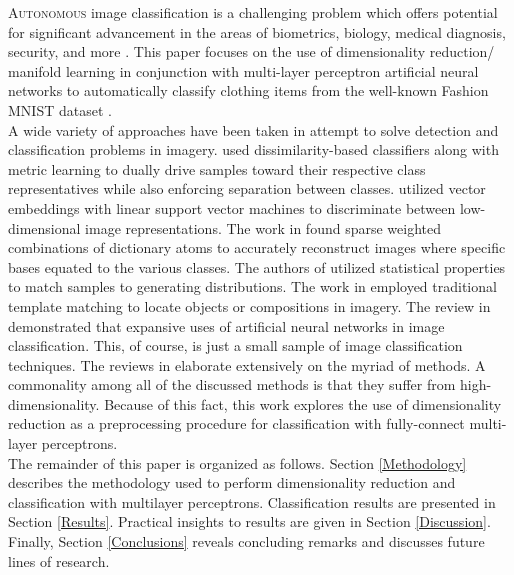 \documentclass[conference]{IEEEtran}
\begin{document}
\lettrine{A}{utonomous} image classification is a challenging problem which offers potential for significant advancement in the areas of biometrics, biology, medical diagnosis, security, and more \cite{Prasad2015Review,Lu2007Review}.  This paper focuses on the use of dimensionality reduction/ manifold learning in conjunction with multi-layer perceptron artificial neural networks to automatically classify clothing items from the well-known Fashion MNIST dataset \cite{Xiao2017FashionMNIST}.  \\
\indent A wide variety of approaches have been taken in attempt to solve detection and classification problems in imagery.  \cite{Mensink2013KNN} used dissimilarity-based classifiers along with metric learning to dually drive samples toward their respective class representatives while also enforcing separation between classes.  \cite{Sanchez2011svm,Lin2011svm} utilized vector embeddings with linear support vector machines to discriminate between low-dimensional image representations.  The work in \cite{Shao2019DictionaryLearning} found sparse weighted combinations of dictionary atoms to accurately reconstruct images where specific bases equated to the various  classes.  The authors of \cite{Timofte2013NaiveBayes} utilized statistical properties to match samples to generating distributions.  The work in \cite{Swaroop2016TemplateMatching} employed traditional template matching to locate objects or compositions in imagery.  The review in \cite{Driss2017MLPandCNN} demonstrated that expansive uses of artificial neural networks in image classification.  This, of course, is just a small sample of image classification techniques.  The reviews in \cite{Prasad2015Review,Lu2007Review} elaborate extensively on the myriad of methods.  A commonality among all of the discussed methods is that they suffer from high-dimensionality.  Because of this fact, this work explores the use of dimensionality reduction as a preprocessing procedure for classification with fully-connect multi-layer perceptrons. \\
\indent The remainder of this paper is organized as follows.  Section \ref{Methodology} describes the methodology used to perform dimensionality reduction and classification with multilayer perceptrons.  Classification results are presented in Section \ref*{Results}.  Practical insights to results are given in Section \ref{Discussion}.  Finally, Section \ref{Conclusions} reveals concluding remarks and discusses future lines of research.


\end{document}
